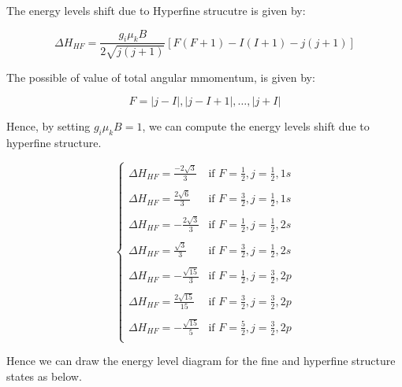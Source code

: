 \documentclass[11pt]{article}
\begin{document}
  The energy levels shift due to Hyperfine strucutre is given by:

  \begin{equation}
    \Delta H_{HF} = \frac{g_i \mu_k B}{2 \sqrt{j(j+1)}}[F(F+1) - I(I+1) - j(j+1)]
  \end{equation}

  The possible of value of total angular mmomentum, is given by:

  \begin{equation}
    F = |j-I|, |j-I+1|, \ldots, |j+I|
  \end{equation}

  Hence, by setting $g_i \mu_k B = 1$, we can compute the energy levels shift due to hyperfine structure.

  \begin{equation}
    \begin{cases}
      \displaystyle
      \Delta H_{HF} = \frac{-2\sqrt{3}}{3} & \text{if } F = \frac{1}{2}, j = \frac{1}{2}, 1s \\
      \\
      \displaystyle
      \Delta H_{HF} = \frac{2\sqrt{6}}{3} & \text{if } F = \frac{3}{2}, j = \frac{1}{2}, 1s \\
      \\
      \displaystyle
      \Delta H_{HF} = -\frac{2\sqrt{3}}{3} & \text{if } F = \frac{1}{2}, j = \frac{1}{2}, 2s \\
      \\
      \displaystyle
      \Delta H_{HF} = \frac{\sqrt{3}}{3} & \text{if } F = \frac{3}{2}, j = \frac{1}{2}, 2s \\
      \\
      \displaystyle
      \Delta H_{HF} = -\frac{\sqrt{15}}{3} & \text{if } F = \frac{1}{2}, j = \frac{3}{2}, 2p \\
      \\
      \displaystyle
      \Delta H_{HF} = \frac{2\sqrt{15}}{15} & \text{if } F = \frac{3}{2}, j = \frac{3}{2}, 2p \\
      \\
      \displaystyle
      \Delta H_{HF} = -\frac{\sqrt{15}}{5} & \text{if } F = \frac{5}{2}, j = \frac{3}{2}, 2p \\
    \end{cases}
  \end{equation}

  Hence we can draw the energy level diagram for the fine and hyperfine structure states as below.
\end{document}
